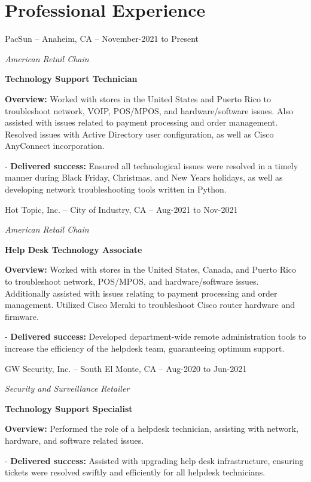 \documentclass[a4paper]{article}
\begin{document}
\section{Professional Experience}
\begin{minipage}{\textwidth}
PacSun -- Anaheim, CA -- November-2021 to Present\par
\textit{American Retail Chain}\par
\textbf{Technology Support Technician}

\medskip
\textbf{Overview:} Worked with stores in the United States and Puerto Rico to troubleshoot network, VOIP, POS/MPOS, and hardware/software issues. Also assisted with issues related to payment processing and order management. Resolved issues with Active Directory user configuration, as well as Cisco AnyConnect incorporation.

\medskip
- \textbf{Delivered success:} Ensured all technological issues were resolved in a timely manner during Black Friday, Christmas, and New Years holidays, as well as developing network troubleshooting tools written in Python.
\end{minipage}

\vspace{20pt}
\begin{minipage}{\textwidth}
Hot Topic, Inc. -- City of Industry, CA -- Aug-2021 to Nov-2021\par
\textit{American Retail Chain}\par
\textbf{Help Desk Technology Associate}

\medskip
\textbf{Overview:} Worked with stores in the United States, Canada, and Puerto Rico to troubleshoot network, POS/MPOS, and hardware/software issues. Additionally assisted with issues relating to payment processing and order management. Utilized Cisco Meraki to troubleshoot Cisco router hardware and firmware.

\medskip
- \textbf{Delivered success:} Developed department-wide remote administration tools to increase the efficiency of the helpdesk team, guaranteeing optimum support.
\end{minipage}

\vspace{20pt}
\begin{minipage}{\textwidth}
GW Security, Inc. -- South El Monte, CA -- Aug-2020 to Jun-2021\par
\textit{Security and Surveillance Retailer}\par
\textbf{Technology Support Specialist}

\medskip
\textbf{Overview:} Performed the role of a helpdesk technician, assisting with network, hardware, and software related issues.

\medskip
- \textbf{Delivered success:} Assisted with upgrading help desk infrastructure, ensuring tickets were resolved swiftly and efficiently for all helpdesk technicians.
\end{minipage}
\end{document}
